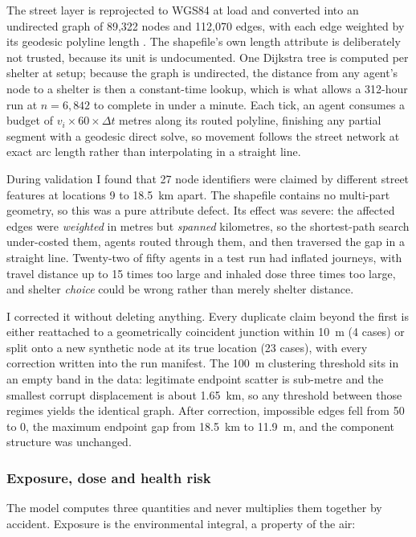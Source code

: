 \documentclass[graybox]{svmult}
\begin{document}
The street layer is reprojected to WGS84 at load and converted into an
undirected graph of 89,322 nodes and 112,070 edges, with each edge weighted by
its geodesic polyline length \cite{karney2013}. The shapefile's own length
attribute is deliberately not trusted, because its unit is undocumented. One
Dijkstra tree \cite{dijkstra1959} is computed per shelter at setup; because the
graph is undirected, the distance from any agent's node to a shelter is then a
constant-time lookup, which is what allows a 312-hour run at $n=6{,}842$ to
complete in under a minute. Each tick, an agent consumes a budget of
$v_i \times 60 \times \Delta t$ metres along its routed polyline, finishing any
partial segment with a geodesic direct solve, so movement follows the street
network at exact arc length rather than interpolating in a straight line.

 During validation I found that 27 node
identifiers were claimed by different street features at locations 9 to 18.5~km
apart. The shapefile contains no multi-part geometry, so this was a pure
attribute defect. Its effect was severe: the affected edges were \emph{weighted}
in metres but \emph{spanned} kilometres, so the shortest-path search
under-costed them, agents routed through them, and then traversed the gap in a
straight line. Twenty-two of fifty agents in a test run had inflated journeys,
with travel distance up to 15 times too large and inhaled dose three times too
large, and shelter \emph{choice} could be wrong rather than merely shelter
distance.

I corrected it without deleting anything. Every duplicate claim beyond the first
is either reattached to a geometrically coincident junction within 10~m (4
cases) or split onto a new synthetic node at its true location (23 cases), with
every correction written into the run manifest. The 100~m clustering threshold
sits in an empty band in the data: legitimate endpoint scatter is sub-metre and
the smallest corrupt displacement is about 1.65~km, so any threshold between
those regimes yields the identical graph. After correction, impossible edges
fell from 50 to 0, the maximum endpoint gap from 18.5~km to 11.9~m, and the
component structure was unchanged.

\subsubsection{Exposure, dose and health risk}
\label{subsec:health}

The model computes three quantities and never multiplies them together by
accident. Exposure is the environmental integral, a property of the air:
\end{document}
